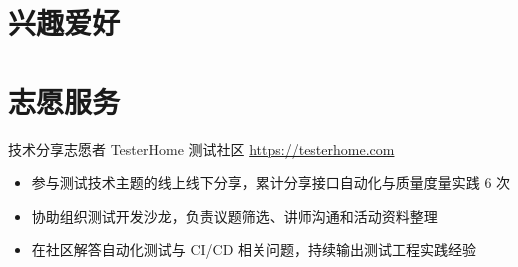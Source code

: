 \documentclass[a4paper, serif, 10pt]{moderncv}
\begin{document}
\section{兴趣爱好}

\section{志愿服务}

        {技术分享志愿者}
        {TesterHome 测试社区}
        {\url{https://testerhome.com}}
        {}
        {\begin{itemize}
\item 参与测试技术主题的线上线下分享，累计分享接口自动化与质量度量实践 6 次
\item 协助组织测试开发沙龙，负责议题筛选、讲师沟通和活动资料整理
\item 在社区解答自动化测试与 CI/CD 相关问题，持续输出测试工程实践经验
\end{itemize}}
    
\end{document}
